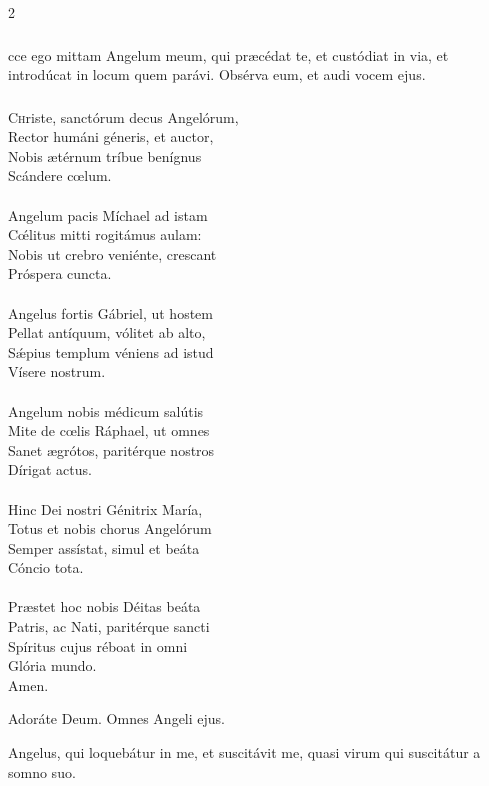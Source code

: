 \documentclass[9pt,twoside]{extarticle}
\begin{document}
\begin{multicols}{2}
\subsubsection*{}
cce ego mittam Angelum meum, qui præcédat te, et custódiat in via, et introdúcat in locum quem parávi. Obsérva eum, et audi vocem ejus.

\subsubsection*{\center {}}
\lettrine{C}hriste, sanctórum decus Angelórum,\\
Rector humáni géneris, et auctor,\\
Nobis ætérnum tríbue benígnus\\
Scándere cœlum.\\
\\
Angelum pacis Míchael ad istam\\
Cœ́litus mitti rogitámus aulam:\\
Nobis ut crebro veniénte, crescant\\
Próspera cuncta.\\
\\
Angelus fortis Gábriel, ut hostem\\
Pellat antíquum, vólitet ab alto,\\
Sǽpius templum véniens ad istud\\
Vísere nostrum.\\
\\
Angelum nobis médicum salútis\\
Mite de cœlis Ráphael, ut omnes\\
Sanet ægrótos, paritérque nostros\\
Dírigat actus.\\
\\
Hinc Dei nostri Génitrix María,\\
Totus et nobis chorus Angelórum\\
Semper assístat, simul et beáta\\
Cóncio tota.\\
\\
Præstet hoc nobis Déitas beáta\\
Patris, ac Nati, paritérque sancti\\
Spíritus cujus réboat in omni\\
Glória mundo.\\
Amen.

\begin{tightlist}{}
\item {} Adoráte Deum.  Omnes Angeli ejus.
\item {} Angelus, qui loquebátur in me, et suscitávit me, quasi virum qui suscitátur a somno suo.
\end{tightlist}


\end{multicols}
\end{document}
